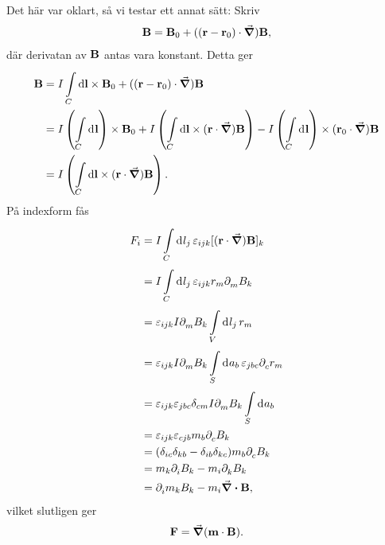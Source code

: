 Det här var oklart, så vi testar ett annat sätt: Skriv
\begin{align*}
	\vb{B} = \vb{B}_{0} + ((\vb{r} - \vb{r}_{0})\cdot\grad)\vb{B},
\end{align*}
där derivatan av $\vb{B}$ antas vara konstant. Detta ger
\begin{align*}
	\vb{B} &= I\int\limits_{C}^{}\dd{\vb{l}}\times \vb{B}_{0} + ((\vb{r} - \vb{r}_{0})\cdot\grad)\vb{B} \\
	       &= I\left(\int\limits_{C}^{}\dd[]{\vb{l}}\right)\times\vb{B}_{0} + I\left(\int\limits_{C}^{}\dd{\vb{l}}\times (\vb{r}\cdot\grad)\vb{B}\right) - I\left(\int\limits_{C}^{}\dd[]{\vb{l}}\right)\times(\vb{r}_{0}\cdot\grad)\vb{B} \\
	       &= I\left(\int\limits_{C}^{}\dd{\vb{l}}\times (\vb{r}\cdot\grad)\vb{B}\right).
\end{align*}
På indexform fås
\begin{align*}
	F_{i} &= I\int\limits_{C}^{}\dd[]{l_{j}}\varepsilon_{ijk}[(\vb{r}\cdot\grad)\vb{B}]_{k} \\
	      &= I\int\limits_{C}^{}\dd[]{l_{j}}\varepsilon_{ijk}r_{m}\partial_{m}^{}B_{k} \\
	      &= \varepsilon_{ijk}I\partial_{m}^{}B_{k}\int\limits_{V}^{}\dd[]{l_{j}}r_{m} \\
	      &= \varepsilon_{ijk}I\partial_{m}^{}B_{k}\int\limits_{S}^{}\dd[]{a_{b}}\varepsilon_{jbc}\partial_{c}^{}r_{m} \\
	      &= \varepsilon_{ijk}\varepsilon_{jbc}\delta_{cm}I\partial_{m}^{}B_{k}\int\limits_{S}^{}\dd[]{a_{b}} \\
	      &= \varepsilon_{ijk}\varepsilon_{cjb}m_{b}\partial_{c}^{}B_{k} \\
	      &= (\delta_{ic}\delta_{kb} - \delta_{ib}\delta_{kc})m_{b}\partial_{c}^{}B_{k} \\
	      &= m_{k}\partial_{i}^{}B_{k} - m_{i}\partial_{k}^{}B_{k} \\
	      &= \partial_{i}^{}m_{k}B_{k} - m_{i}\div{\vb{B}},
\end{align*}
vilket slutligen ger
\begin{align*}
	\vb{F} = \grad(\vb{m}\cdot\vb{B}).
\end{align*}

